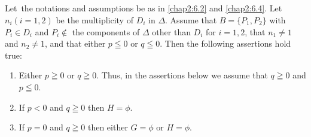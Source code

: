 \subsection{}\label{chap2:6.5}
\begin{lemma*}
  Let\pageoriginale\ the notations and assumptions be as in \ref{chap2:6.2} and
  \ref{chap2:6.4}. Let $n_{i}(i=1,2)$ be the multiplicity of $D_{i}$ in
  $\Delta$. Assume that $B=\{P_{1},P_{2}\}$ with $P_{i}\in D_{i}$ and
  $P_{i}\not\in$ the components of $\Delta$ other than $D_{i}$ for
  $i=1,2$, that $n_{1}\neq 1$ and $n_{2}\neq 1$, and that either $p\leqq
  0$ or $q\leqq 0$. Then the following assertions hold true:
  \begin{enumerate}
    \renewcommand{\labelenumi}{\rm(\theenumi)}
  \item Either $p\geqq 0$ or $q\geqq 0$. Thus, in the assertions below
    we assume that $q\geqq 0$ and $p\leqq 0$.
    
  \item If $p<0$ and $q\geqq 0$ then $H=\phi$.
    
  \item If $p=0$ and $q\geqq 0$ then either $G=\phi$ or $H=\phi$.
  \end{enumerate}
\end{lemma*}


